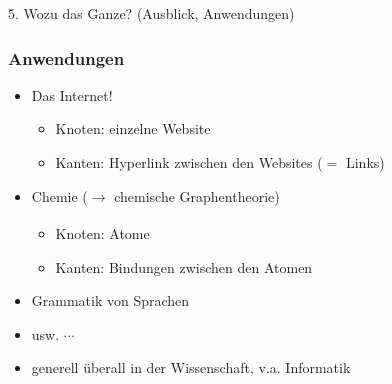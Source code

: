 \documentclass{beamer}
\begin{document}
\begin{frame}{5. Wozu das Ganze? (Ausblick, Anwendungen)}
    
\end{frame}
\begin{frame}
    \frametitle{Anwendungen}
    \begin{itemize}
        \item Das Internet!\\
        \begin{itemize}
            \item Knoten: einzelne Website
            \item Kanten: Hyperlink zwischen den Websites (\(=\) Links)
        \end{itemize}
        \item Chemie (\(\xrightarrow[]{}\) chemische Graphentheorie)\\
        \begin{itemize}
            \item Knoten: Atome
            \item Kanten: Bindungen zwischen den Atomen 
        \end{itemize}
        \item Grammatik von Sprachen 
        \item usw. \(\cdots\)
        \item generell überall in der Wissenschaft, v.a. Informatik
    \end{itemize}
\end{frame}
\end{document}
